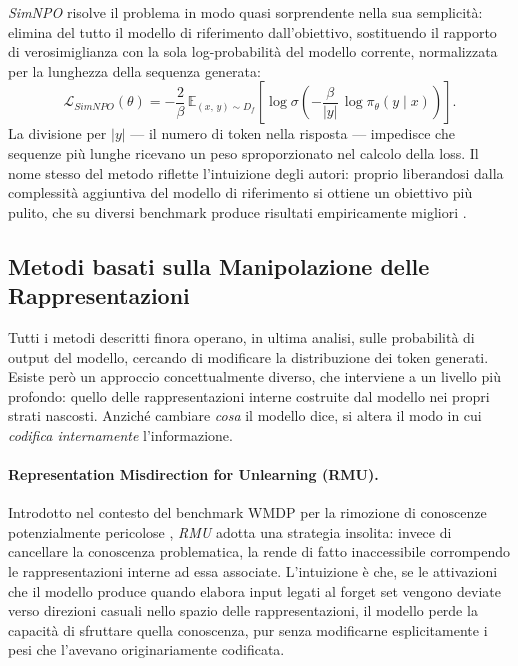\emph{SimNPO} risolve il problema in modo quasi sorprendente nella sua semplicità: elimina del tutto il modello di riferimento dall'obiettivo, sostituendo il rapporto di verosimiglianza con la sola log-probabilità del modello corrente, normalizzata per la lunghezza della sequenza generata:
\begin{equation}
    \mathcal{L}_{SimNPO}(\theta) = -\frac{2}{\beta}\,\mathbb{E}_{(x,\,y) \sim D_f}\!\left[\log \sigma\!\left(-\frac{\beta}{|y|}\, \log \pi_\theta(y \mid x)\right)\right].
    \label{eq:simnpo}
\end{equation}
La divisione per $|y|$ — il numero di token nella risposta — impedisce che sequenze più lunghe ricevano un peso sproporzionato nel calcolo della loss. Il nome stesso del metodo riflette l'intuizione degli autori: proprio liberandosi dalla complessità aggiuntiva del modello di riferimento si ottiene un obiettivo più pulito, che su diversi benchmark produce risultati empiricamente migliori \cite{fan_simplicity_2024}.

\subsection{Metodi basati sulla Manipolazione delle Rappresentazioni}

Tutti i metodi descritti finora operano, in ultima analisi, sulle probabilità di output del modello, cercando di modificare la distribuzione dei token generati. Esiste però un approccio concettualmente diverso, che interviene a un livello più profondo: quello delle rappresentazioni interne costruite dal modello nei propri strati nascosti. Anziché cambiare \emph{cosa} il modello dice, si altera il modo in cui \emph{codifica internamente} l'informazione.

\paragraph{Representation Misdirection for Unlearning (RMU).}
Introdotto nel contesto del benchmark WMDP per la rimozione di conoscenze potenzialmente pericolose \cite{li2024wmdpbenchmarkmeasuringreducing}, \emph{RMU} adotta una strategia insolita: invece di cancellare la conoscenza problematica, la rende di fatto inaccessibile corrompendo le rappresentazioni interne ad essa associate. L'intuizione è che, se le attivazioni che il modello produce quando elabora input legati al forget set vengono deviate verso direzioni casuali nello spazio delle rappresentazioni, il modello perde la capacità di sfruttare quella conoscenza, pur senza modificarne esplicitamente i pesi che l'avevano originariamente codificata.

